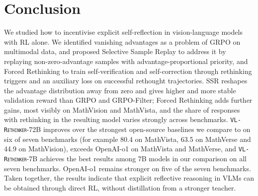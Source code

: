 \documentclass{article}
\newcommand{\model}{\texttt{\textsc{VL-Rethinker}}\xspace}
\begin{document}
\section{Conclusion}
\label{sec:conclusion}

We studied how to incentivise explicit self-reflection in vision-language models with RL alone. We identified vanishing advantages as a problem of GRPO on multimodal data, and proposed Selective Sample Replay to address it by replaying non-zero-advantage samples with advantage-proportional priority, and Forced Rethinking to train self-verification and self-correction through rethinking triggers and an auxiliary loss on successful rethought trajectories. SSR reshapes the advantage distribution away from zero and gives higher and more stable validation reward than GRPO and GRPO-Filter; Forced Rethinking adds further gains, most visibly on MathVision and MathVista, and the share of responses with rethinking in the resulting model varies strongly across benchmarks. \model-72B improves over the strongest open-source baselines we compare to on six of seven benchmarks (for example 80.4 on MathVista, 63.5 on MathVerse and 44.9 on MathVision), exceeds OpenAI-o1 on MathVista and MathVerse, and \model-7B achieves the best results among 7B models in our comparison on all seven benchmarks. OpenAI-o1 remains stronger on five of the seven benchmarks. Taken together, the results indicate that explicit reflective reasoning in VLMs can be obtained through direct RL, without distillation from a stronger teacher.




\end{document}
